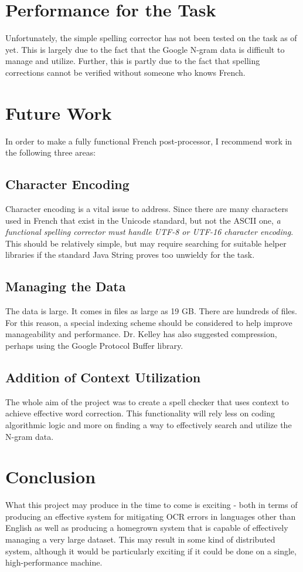 \documentclass[11pts]{article}
\begin{document}
\section{Performance for the Task}
Unfortunately, the simple spelling corrector has not been tested on the task as of yet. This is largely due to the fact that the Google N-gram data is difficult to manage and utilize. Further, this is partly due to the fact that spelling corrections cannot be verified without someone who knows French.

\section{Future Work}
In order to make a fully functional French post-processor, I recommend work in the following three areas:

\subsection{Character Encoding}
Character encoding is a vital issue to address. Since there are many characters used in French that exist in the Unicode standard, but not the ASCII one, \emph{a functional spelling corrector must handle UTF-8 or UTF-16 character encoding}. This should be relatively simple, but may require searching for suitable helper libraries if the standard Java String proves too unwieldy for the task.

\subsection{Managing the Data}
The data is large. It comes in files as large as 19 GB. There are hundreds of files. For this reason, a special indexing scheme should be considered to help improve manageability and performance. Dr. Kelley has also suggested compression, perhaps using the Google Protocol Buffer library.

\subsection{Addition of Context Utilization}
The whole aim of the project was to create a spell checker that uses context to achieve effective word correction. This functionality will rely less on coding algorithmic logic and more on finding a way to effectively search and utilize the N-gram data.

\section{Conclusion}
What this project may produce in the time to come is exciting - both in terms of producing an effective system for mitigating OCR errors in languages other than English as well as producing a homegrown system that is capable of effectively managing a very large dataset. This may result in some kind of distributed system, although it would be particularly exciting if it could be done on a single, high-performance machine.
\end{document}
